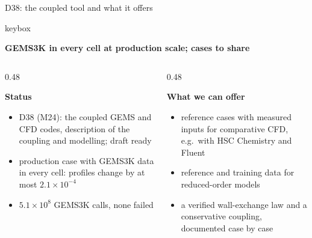 \documentclass[aspectratio=169,10pt]{beamer}
\newcommand{\subhead}[1]{{\normalsize\bfseries\color{PSIblack}#1\par}\vspace{0.15em}}
\newcommand{\key}[1]{\begin{beamercolorbox}[sep=0.35em,wd=\linewidth]{keybox}\small\raggedright\textbf{#1}\end{beamercolorbox}\vspace{0.3em}}
\begin{document}
\begin{frame}[t]{D38: the coupled tool and what it offers}
  \key{GEMS3K in every cell at production scale; cases to share}
  \begin{columns}[T,onlytextwidth]
    \begin{column}{0.48\textwidth}
      \subhead{Status}
      \begin{itemize}
        \item D38 (M24): the coupled GEMS and CFD codes, description of the coupling and modelling; draft ready
        \item production case with GEMS3K data in every cell: profiles change by at most $2.1\times10^{-4}$
        \item $5.1\times10^{8}$ GEMS3K calls, none failed
      \end{itemize}
    \end{column}
    \begin{column}{0.48\textwidth}
      \subhead{What we can offer}
      \begin{itemize}
        \item reference cases with measured inputs for comparative CFD, e.g.\ with HSC Chemistry and Fluent
        \item reference and training data for reduced-order models
        \item a verified wall-exchange law and a conservative coupling, documented case by case
      \end{itemize}
    \end{column}
  \end{columns}
\end{frame}
\end{document}
